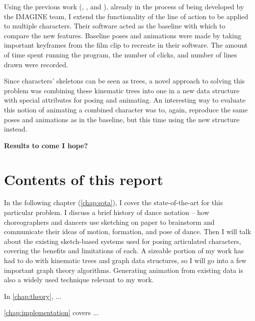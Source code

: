 Using the previous work (\citep{guay2013line}, \citep{guay2015adding}, and \citep{guay2015space}), already in the process of being developed by the IMAGINE team, I extend the functionality of the line of action to be applied to multiple characters. Their software acted as the baseline with which to compare the new features. Baseline poses and animations were made by taking important keyframes from the film clip to recreate in their software. The amount of time spent running the program, the number of clicks, and number of lines drawn were recorded.

Since characters' skeletons can be seen as trees, a novel approach to solving this problem was combining these kinematic trees into one in a new data structure with special attributes for posing and animating. An interesting way to evaluate this notion of animating a combined character was to, again, reproduce the same poses and animations as in the baseline, but this time using the new structure instead.

\textbf{Results to come I hope?}

\section{Contents of this report}

In the following chapter (\autoref{chap:sota}), I cover the state-of-the-art for this particular problem. I discuss a brief history of dance notation -- how choreographers and dancers use sketching on paper to brainstorm and communicate their ideas of motion, formation, and pose of dance. Then I will talk about the existing sketch-based systems used for posing articulated characters, covering the benefits and limitations of each. A sizeable portion of my work has had to do with kinematic trees and graph data structures, so I will go into a few important graph theory algorithms. Generating animation from existing data is also a widely used technique relevant to my work.

In \autoref{chap:theory}, ...

\autoref{chap:implementation} covers ...

